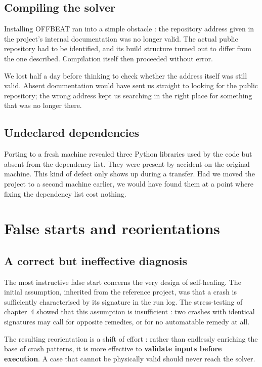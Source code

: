 \subsection{Compiling the solver}

Installing OFFBEAT ran into a simple obstacle : the repository address given in
the project's internal documentation was no longer valid. The actual public
repository had to be identified, and its build structure turned out to differ
from the one described. Compilation itself then proceeded without error.

We lost half a day before thinking to check whether the address itself was
still valid. Absent documentation would have sent us straight to looking for the
public repository; the wrong address kept us searching in the right place for
something that was no longer there.

\subsection{Undeclared dependencies}

Porting to a fresh machine revealed three Python libraries used by the code but
absent from the dependency list. They were present by accident on the original
machine. This kind of defect only shows up during a transfer. Had we moved the project
to a second machine earlier, we would have found them at a point where fixing the
dependency list cost nothing.

\section{False starts and reorientations}

\subsection{A correct but ineffective diagnosis}

The most instructive false start concerns the very design of self-healing. The
initial assumption, inherited from the reference project, was that a crash is
sufficiently characterised by its signature in the run log. The stress-testing
of chapter~4 showed that this assumption is insufficient : two crashes with
identical signatures may call for opposite remedies, or for no automatable
remedy at all.

The resulting reorientation is a shift of effort : rather than endlessly
enriching the base of crash patterns, it is more effective to \textbf{validate
inputs before execution}. A case that cannot be physically valid should never
reach the solver.

